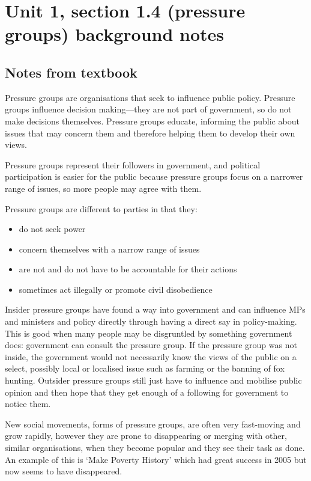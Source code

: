 \documentclass[12pt]{article}
\begin{document}
\section*{Unit 1, section 1.4 (pressure groups) background notes}

\subsection*{Notes from textbook}

Pressure groups are organisations that seek to influence public policy.
Pressure groups influence decision making---they are not part of
government, so do not make decisions themselves.  Pressure groups educate,
informing the public about issues that may concern them and therefore
helping them to develop their own views.

Pressure groups represent their followers in government, and political
participation is easier for the public because pressure groups focus on a
narrower range of issues, so more people may agree with them.

Pressure groups are different to parties in that they:

\begin{itemize}
	\item{do not seek power}
	\item{concern themselves with a narrow range of issues}
	\item{are not and do not have to be accountable for their actions}
	\item{sometimes act illegally or promote civil disobedience}
\end{itemize}

Insider pressure groups have found a way into government and can influence
MPs and ministers and policy directly through having a direct say in
policy-making.  This is good when many people may be disgruntled by
something government does: government can consult the pressure group.  If
the pressure group was not inside, the government would not necessarily
know the views of the public on a select, possibly local or localised
issue such as farming or the banning of fox hunting.  Outsider pressure
groups still just have to influence and mobilise public opinion and then
hope that they get enough of a following for government to notice them.

New social movements, forms of pressure groups, are often very fast-moving
and grow rapidly, however they are prone to disappearing or merging with
other, similar organisations, when they become popular and they see their
task as done.  An example of this is `Make Poverty History' which had great
success in 2005 but now seems to have disappeared.
\end{document}
